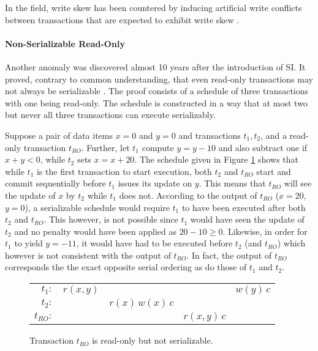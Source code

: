 In the field, write skew has been countered by inducing artificial write
conflicts between transactions that are expected to exhibit write skew
\cite{fekete2005making}.

\paragraph{Non-Serializable Read-Only}

Another anomaly was discovered almost 10 years after the introduction of SI. It
proved, contrary to common understanding, that even read-only transactions may
not always be serializable \cite{fekete2004read}. The proof consists of a
schedule of three transactions with one being read-only. The schedule is
constructed in a way that at most two but never all three transactions can
execute serializably.

Suppose a pair of data items $x = 0$ and $y = 0$ and transactions $t_1, t_2$,
and a read-only transaction $t_{RO}$. Further, let $t_1$ compute $y = y - 10$
and also subtract one if $x + y < 0$, while $t_2$ sets $x = x + 20$. The
schedule given in Figure \ref{fig:bad_read_only} shows that while $t_1$ is the
first transaction to start execution, both $t_2$ and $t_{RO}$ start and commit
sequentially before $t_1$ issues its update on $y$. This means that $t_{RO}$
will see the update of $x$ by $t_2$ while $t_1$ does not. According to the
output of $t_{RO}$ ($x = 20$, $y = 0$), a serializable schedule would require
$t_1$ to have been executed after both $t_2$ and $t_{RO}$. This however, is not
possible since $t_1$ would have seen the update of $t_2$ and no penalty would
have been applied as $20 - 10 \geq 0$. Likewise, in order for $t_1$ to yield $y =
-11$, it would have had to be executed before $t_2$ (and $t_{RO}$) which however
is not consistent with the output of $t_{RO}$. In fact, the output of $t_{RO}$
corresponds the the exact opposite serial ordering as do those of $t_1$ and
$t_2$.

\begin{figure}[h!]
    \centering
    \begin{tabular}{r c c c c}
    $t_1:$    & $r(x,y)$ &                   &              & $w(y)\, c$ \\
    $t_2:$    &          & $r(x)\, w(x)\, c$ &              &            \\
    $t_{RO}:$ &          &                   & $r(x,y)\, c$ &
    \end{tabular}
    \caption{Transaction $t_{RO}$ is read-only but not serializable.}
    \label{fig:bad_read_only}
\end{figure}

